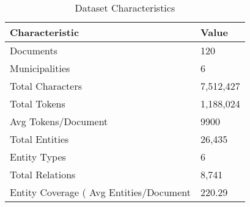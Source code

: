 \begin{table}
\caption{Dataset Characteristics}
\label{tab:dataset_char}
\begin{tabular}{ll}
\toprule
Characteristic & Value \\
\midrule
Documents & 120 \\
Municipalities & 6 \\
Total Characters & 7,512,427 \\
Total Tokens & 1,188,024 \\
Avg Tokens/Document & 9900 \\
Total Entities & 26,435 \\
Entity Types & 6 \\
Total Relations & 8,741 \\
Entity Coverage (%
Avg Entities/Document & 220.29 \\
\bottomrule
\end{tabular}
\end{table}
